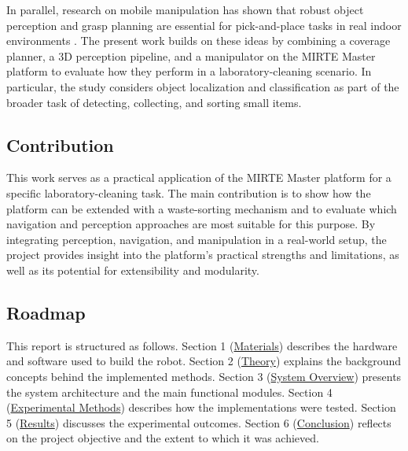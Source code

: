 In parallel, research on mobile manipulation has shown that robust object perception and grasp planning are essential for pick-and-place tasks in real indoor environments \cite{STUCKLER20131106}. The present work builds on these ideas by combining a coverage planner, a 3D perception pipeline, and a manipulator on the MIRTE Master platform to evaluate how they perform in a laboratory-cleaning scenario. In particular, the study considers object localization and classification as part of the broader task of detecting, collecting, and sorting small items.

\subsection{Contribution}

This work serves as a practical application of the MIRTE Master platform for a specific laboratory-cleaning task. The main contribution is to show how the platform can be extended with a waste-sorting mechanism and to evaluate which navigation and perception approaches are most suitable for this purpose. By integrating perception, navigation, and manipulation in a real-world setup, the project provides insight into the platform's practical strengths and limitations, as well as its potential for extensibility and modularity.

\subsection{Roadmap}

This report is structured as follows. Section 1 (\href{https://matt-rbt.github.io/Lab-Cleanup-Robot-using-the-Mirte-Master-Platform/materials/}{Materials}) describes the hardware and software used to build the robot. Section 2 (\href{https://matt-rbt.github.io/Lab-Cleanup-Robot-using-the-Mirte-Master-Platform/theory/}{Theory}) explains the background concepts behind the implemented methods. Section 3 (\href{https://matt-rbt.github.io/Lab-Cleanup-Robot-using-the-Mirte-Master-Platform/systemoverview/}{System Overview}) presents the system architecture and the main functional modules. Section 4 (\href{https://matt-rbt.github.io/Lab-Cleanup-Robot-using-the-Mirte-Master-Platform/methods/}{Experimental Methods}) describes how the implementations were tested. Section 5 (\href{https://matt-rbt.github.io/Lab-Cleanup-Robot-using-the-Mirte-Master-Platform/results/}{Results}) discusses the experimental outcomes. Section 6 (\href{https://matt-rbt.github.io/Lab-Cleanup-Robot-using-the-Mirte-Master-Platform/conclusion/}{Conclusion}) reflects on the project objective and the extent to which it was achieved.
